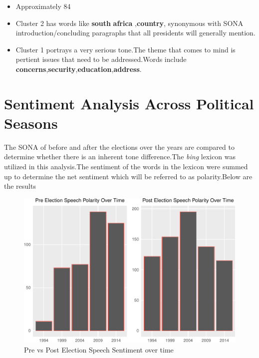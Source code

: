 \documentclass[]{article}
\begin{document}
\begin{itemize}

\item Approximately 84%
\item Cluster 2 has words like \textbf{south} \textbf{africa} ,\textbf{country}, synonymous with SONA introduction/concluding paragraphs that all presidents will generally mention.
\item Cluster 1 portrays a very serious tone.The theme that comes to mind is pertient issues that need to be addressed.Words include \textbf{concerns},\textbf{security},\textbf{education},\textbf{address}.
\end{itemize}

\section{Sentiment Analysis Across Political Seasons}

The SONA of before and after the elections over the years are compared
to determine whether there is an inherent tone difference.The
\emph{bing} lexicon was utilized in this analysis.The sentiment of the
words in the lexicon were summed up to determine the net sentiment which
will be referred to as polarity.Below are the results

\begin{figure}[H]

{\centering \includegraphics{datasci_fi_Assignment_2_files/figure-latex/pre_post_sentiment -1} 

}

\caption{Pre vs Post Election Speech Sentiment over time}\label{fig:pre_post_sentiment }
\end{figure}
\end{document}

